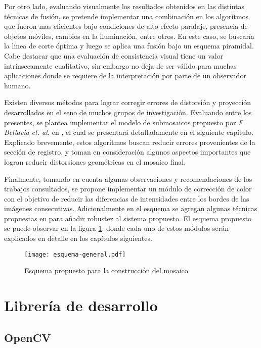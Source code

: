 Por otro lado, evaluando visualmente los resultados obtenidos en las distintas técnicas de fusión, se pretende implementar una combinación en los algoritmos que fueron mas eficientes bajo condiciones de alto efecto paralaje, presencia de objetos móviles, cambios en la iluminación, entre otros. En este caso, se buscaría la linea de corte óptima y luego se aplica una fusión bajo un esquema piramidal. Cabe destacar que una evaluación de consistencia visual tiene un valor intrínsecamente cualitativo, sin embargo no deja de ser válido para muchas aplicaciones donde se requiere de la interpretación por parte de un observador humano.

Existen diversos métodos para lograr corregir errores de distorsión y proyección desarrollados en el seno de muchos grupos de investigación. Evaluando entre los presentes, se plantea implementar el modelo de submosaicos propuesto por \textit{F. Bellavia et. al.} en \cite{bellavia-ransac,bellavia-ref}, el cual se presentará detalladamente en el siguiente capítulo. Explicado brevemente, estos algoritmos buscan reducir errores provenientes de la sección de registro, y toman en consideración algunos aspectos importantes que logran reducir distorsiones geométricas en el mosaico final. 

Finalmente, tomando en cuenta algunas observaciones y recomendaciones de los trabajos consultados, se propone implementar un módulo de corrección de color con el objetivo de reducir las diferencias de intensidades entre los bordes de las imágenes consecutivas. Adicionalmente en el esquema se agregan algunas técnicas propuestas en \cite{grid} para añadir robustez al sistema propuesto. El esquema propuesto se puede observar en la figura \ref{imagen:esquema}, donde cada uno de estos módulos serán explicados en detalle en los capítulos siguientes.

\begin{figure}[H]
	\centerline{
		\texttt{[image: esquema-general.pdf]}}
		\caption{Esquema propuesto para la construcción del mosaico}
	\label{imagen:esquema}
\end{figure}

\section{Librería de desarrollo}

\subsection{OpenCV}

